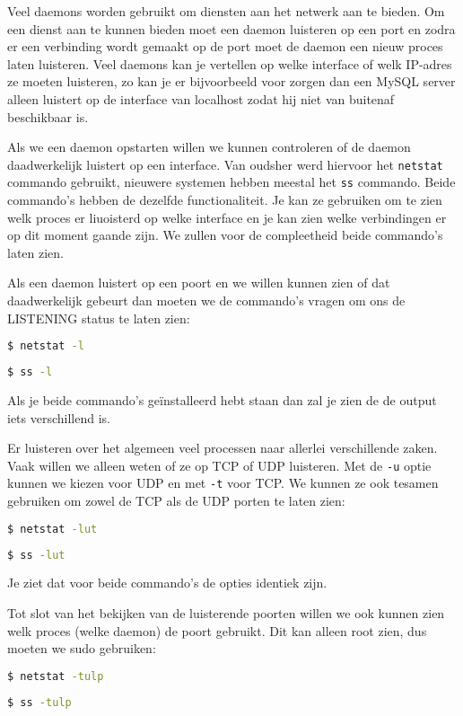 Veel daemons worden gebruikt om diensten aan het netwerk aan te bieden. Om een dienst aan te kunnen bieden moet een daemon luisteren op een port en zodra er een verbinding wordt gemaakt op de port moet de daemon een nieuw proces laten luisteren. Veel daemons kan je vertellen op welke interface of welk IP-adres ze moeten luisteren, zo kan je er bijvoorbeeld voor zorgen dan een MySQL server alleen luistert op de interface van localhost zodat hij niet van buitenaf beschikbaar is.

Als we een daemon opstarten willen we kunnen controleren of de daemon daadwerkelijk luistert op een interface. Van oudsher werd hiervoor het \texttt{netstat} commando gebruikt, nieuwere systemen hebben meestal het \texttt{ss} commando. Beide commando's hebben de dezelfde functionaliteit. Je kan ze gebruiken om te zien welk proces er liuoisterd op welke interface en je kan zien welke verbindingen er op dit moment gaande zijn. We zullen voor de compleetheid beide commando's laten zien.

Als een daemon luistert op een poort en we willen kunnen zien of dat daadwerkelijk gebeurt dan moeten we de commando's vragen om ons de LISTENING status te laten zien:
\begin{lstlisting}[language=bash]
$ netstat -l
\end{lstlisting}
\begin{lstlisting}[language=bash]
$ ss -l
\end{lstlisting}
Als je beide commando's ge\"installeerd hebt staan dan zal je zien de de output iets verschillend is.

Er luisteren over het algemeen veel processen naar allerlei verschillende zaken. Vaak willen we alleen weten of ze op TCP of UDP luisteren. Met de \texttt{-u} optie kunnen we kiezen voor UDP en met \texttt{-t} voor TCP. We kunnen ze ook tesamen gebruiken om zowel de TCP als de UDP porten te laten zien:
\begin{lstlisting}[language=bash]
$ netstat -lut
\end{lstlisting}
\begin{lstlisting}[language=bash]
$ ss -lut
\end{lstlisting}
Je ziet dat voor beide commando's de opties identiek zijn.

Tot slot van het bekijken van de luisterende poorten willen we ook kunnen zien welk proces (welke daemon) de poort gebruikt. Dit kan alleen root zien, dus moeten we sudo gebruiken:
\begin{lstlisting}[language=bash]
$ netstat -tulp
\end{lstlisting}
\begin{lstlisting}[language=bash]
$ ss -tulp
\end{lstlisting}

